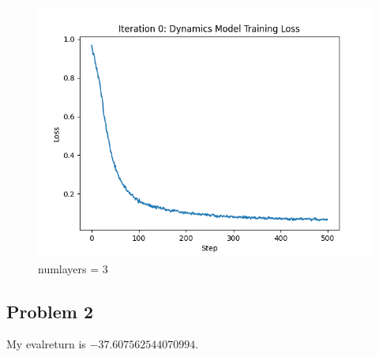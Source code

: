 \documentclass[10pt]{report}
\begin{document}
\newpage
\begin{figure}[h]
	\includegraphics[width=\textwidth]{figures/Problem 1/itr_0_loss_curve_numlayers_3.png}
	\caption{num\textunderscore layers = 3}
\end{figure}

\newpage
\subsection*{Problem 2}
My eval\textunderscore return is $-37.607562544070994$.

\newpage
\end{document}
